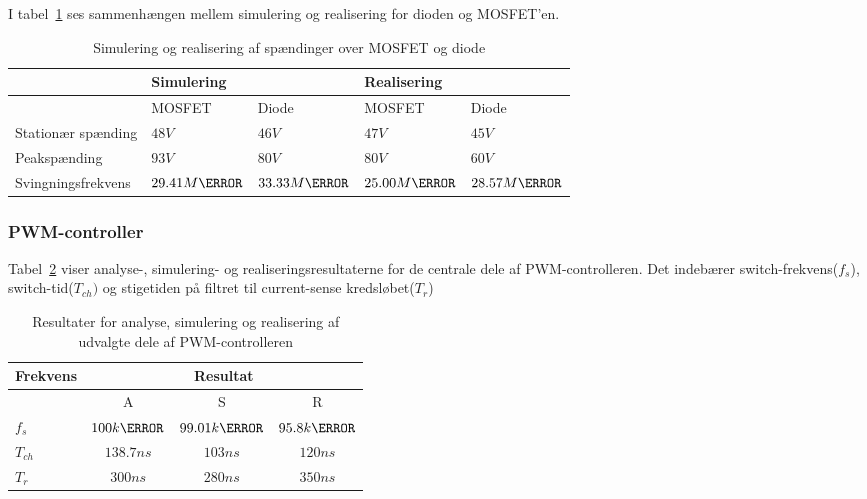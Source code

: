 I tabel~\ref{tab:MOSDIODE} ses sammenhængen mellem simulering og realisering for dioden og MOSFET'en.
\begin{table}[H] 			
	\centering
	\begin{tabularx}{\textwidth}{|X|l|l|l|l|}
		\hline
		& \multicolumn{2}{|X|}{\textbf{Simulering}} & \multicolumn{2}{|X|}{\textbf{Realisering}} \\ \hline
		& MOSFET & Diode & MOSFET & Diode \\ \hline
		Stationær spænding & $48V$ & $46V$ & $47V$ & $45V$ \\ \hline
		Peakspænding & $93V$ & $80V$ & $80V$ & $60V$ \\ \hline
		Svingningsfrekvens & $29.41M\hertz$ & $33.33M\hertz$ & $25.00M\hertz$ & $28.57M\hertz$ \\ \hline
	\end{tabularx}
	\caption{Simulering og realisering af spændinger over MOSFET og diode}
	\label{tab:MOSDIODE}
\end{table}

\subsubsection{PWM-controller}
Tabel~\ref{tab:resultat_PWM} viser analyse-, simulering- og realiseringsresultaterne for de centrale dele af PWM-controlleren. Det indebærer switch-frekvens($f_s$), switch-tid($T_{ch})$ og stigetiden på filtret til current-sense kredsløbet($T_r$)
\begin{table}[H] 			
	\centering
	\begin{tabularx}{\textwidth}{|X|c|c|c|}
		\hline
		\textbf{Frekvens} & \multicolumn{3}{|c|}{\textbf{Resultat}} 		\\ \hline
		& A & S & R 									\\ \hline 
		$f_s$ & $100k\hertz$ & $99.01k\hertz$ & $95.8k\hertz$ 									\\ \hline
		$T_{ch}$ & $138.7ns$ & $103ns$ & $120ns$ 									\\ \hline
		$T_r$ & $300ns$ & $280ns$ & $350ns$ 									\\ \hline
	\end{tabularx}
	\caption{Resultater for analyse, simulering og realisering af udvalgte dele af PWM-controlleren}
	\label{tab:resultat_PWM}
\end{table}

